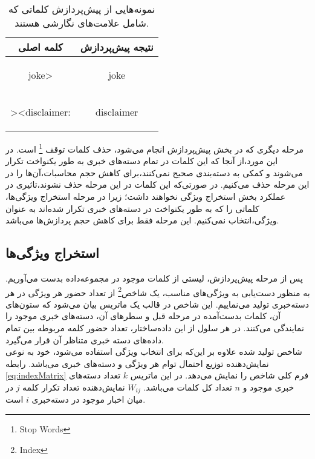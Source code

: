\documentclass[11.5pt,a4paper]{article}
\begin{document}
\begin{table}[h]
\caption{نمونه‌هایی از پیش‌پردازش کلماتی که شامل علامت‌های نگارشی هستند.}
\label{table:preprocessPuncts}
\centering
\begin{tabular}{c | c}
کلمه اصلی & نتیجه پیش‌پردازش\\
\hline
\hline
	\begin{latin}
	joke>
	\end{latin}
	&
	\begin{latin}
	joke
	\end{latin}
\\
	\begin{latin}
	><disclaimer:
	\end{latin}
	&
	\begin{latin}
	disclaimer
	\end{latin}
\\
\end{tabular}
\end{table}

مرحله دیگری که در بخش پیش‌پردازش انجام می‌شود، حذف کلمات توقف \footnote{Stop Words} است. در این مورد،‌از آنجا که این کلمات در تمام دسته‌های خبری به طور یکنواخت تکرار می‌شوند و کمکی به دسته‌بندی صحیح نمی‌کنند،‌برای کاهش حجم محاسبات،‌آن‌ها را در این مرحله حذف می‌کنیم. در صورتی‌که این کلمات در این مرحله حذف نشوند،‌تاثیری در عملکرد بخش استخراج ویژگی نخواهند داشت؛ زیرا در مرحله استخراج ویژگی‌ها،‌ کلماتی را که به طور یکنواخت در دسته‌های خبری تکرار شده‌اند به عنوان ویژگی،‌انتخاب نمی‌کنیم. این مرحله فقط برای کاهش حجم پردازش‌ها می‌باشد.

\subsection{استخراج ویژگی‌ها}
پس از مرحله پیش‌پردازش، لیستی از کلمات موجود در مجموعه‌داده بدست می‌آوریم. به منظور دست‌یابی به ویژگی‌های مناسب، یک شاخص\footnote{Index} از تعداد حضور هر ویژگی در هر دسته‌خبری تولید می‌نماییم. این شاخص در قالب یک ماتریس بیان می‌شود که ستون‌های آن، کلمات بدست‌آمده در مرحله قبل و سطرهای آن، دسته‌های خبری موجود را نمایندگی می‌کنند. در هر سلول از این داده‌ساختار، تعداد حضور کلمه مربوطه بین تمام ‌‌داده‌های دسته خبری متناظر آن قرار می‌گیرد. \\
شاخص تولید شده علاوه بر این‌که برای انتخاب ویژگی استفاده می‌شود، خود به نوعی نمایش‌دهنده توزیع احتمال توام هر ویژگی و دسته‌های خبری می‌باشد. رابطه \ref{eq:indexMatrix} فرم کلی شاخص را نمایش می‌دهد. در این ماتریس  $k$ تعداد دسته‌های خبری موجود و $n$ تعداد کل کلمات می‌باشد.
 $W_{ij}$ نمایش‌دهنده تعداد تکرار کلمه $j$ در میان اخبار موجود در دسته‌خبری $i$ است.
\end{document}
